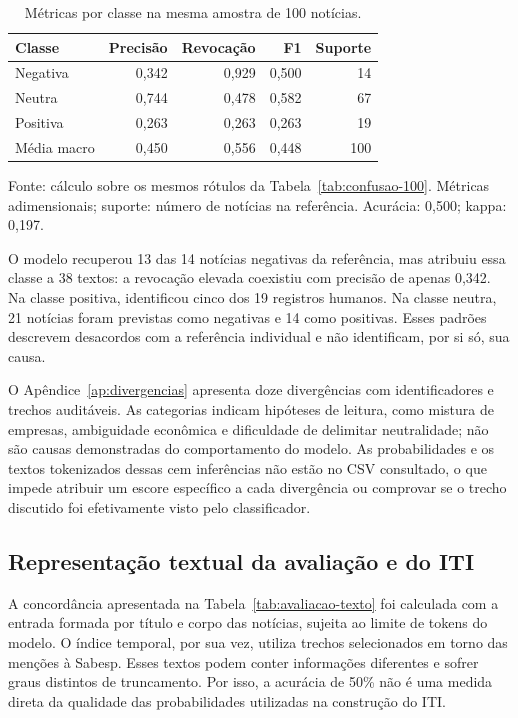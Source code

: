 \begin{table}[htbp]
\centering
\caption{Métricas por classe na mesma amostra de 100 notícias.}
\label{tab:metricas-classe-100}
\begin{tabular}{lrrrr}
\toprule
Classe & Precisão & Revocação & F1 & Suporte \\
\midrule
Negativa & 0,342 & 0,929 & 0,500 & 14 \\
Neutra & 0,744 & 0,478 & 0,582 & 67 \\
Positiva & 0,263 & 0,263 & 0,263 & 19 \\
\midrule
Média macro & 0,450 & 0,556 & 0,448 & 100 \\
\bottomrule
\end{tabular}
\par\smallskip
{\footnotesize Fonte: cálculo sobre os mesmos rótulos da Tabela~\ref{tab:confusao-100}. Métricas adimensionais; suporte: número de notícias na referência. Acurácia: 0,500; kappa: 0,197.}
\end{table}

O modelo recuperou 13 das 14 notícias negativas da referência, mas atribuiu essa classe a 38 textos: a revocação elevada coexistiu com precisão de apenas 0,342. Na classe positiva, identificou cinco dos 19 registros humanos. Na classe neutra, 21 notícias foram previstas como negativas e 14 como positivas. Esses padrões descrevem desacordos com a referência individual e não identificam, por si só, sua causa.

O Apêndice~\ref{ap:divergencias} apresenta doze divergências com identificadores e trechos auditáveis. As categorias indicam hipóteses de leitura, como mistura de empresas, ambiguidade econômica e dificuldade de delimitar neutralidade; não são causas demonstradas do comportamento do modelo. As probabilidades e os textos tokenizados dessas cem inferências não estão no CSV consultado, o que impede atribuir um escore específico a cada divergência ou comprovar se o trecho discutido foi efetivamente visto pelo classificador.

\subsection{Representação textual da avaliação e do ITI}

A concordância apresentada na Tabela~\ref{tab:avaliacao-texto} foi calculada com a entrada formada por título e corpo das notícias, sujeita ao limite de tokens do modelo. O índice temporal, por sua vez, utiliza trechos selecionados em torno das menções à Sabesp. Esses textos podem conter informações diferentes e sofrer graus distintos de truncamento. Por isso, a acurácia de 50\% não é uma medida direta da qualidade das probabilidades utilizadas na construção do ITI.

